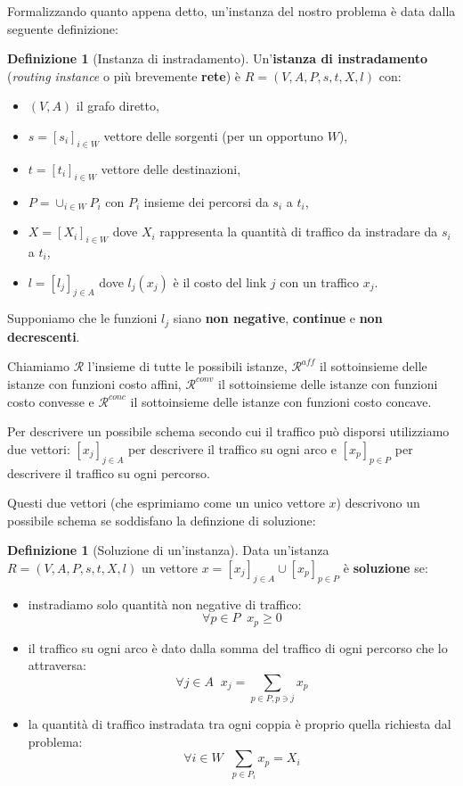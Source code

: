 \documentclass[a4paper]{article}
\newcounter{counter1}
\theoremstyle{plain}
\theoremstyle{definition}
\newtheorem{mydef}[counter1]{Definizione}
\theoremstyle{remark}
\newcommand{\bra}[1]{\left[#1\right]}
\begin{document}
Formalizzando quanto appena detto, un'instanza del nostro problema è
data dalla seguente definizione:

\begin{mydef}[Instanza di instradamento]
  Un'\textbf{istanza di instradamento} (\textit{routing instance} o
  più brevemente \textbf{rete}) è $R=(V,A,P,s,t,X,l)$ con:
  \begin{itemize}
  \item $(V,A)$ il grafo diretto,
  \item $s = \bra{s_i}_{i\in W}$ vettore delle sorgenti (per un opportuno $W$),
  \item $t = \bra{t_i}_{i\in W}$ vettore delle destinazioni,
  \item $P = \cup _{i\in W} P_i$ con $P_i$ insieme dei
    percorsi da $s_i$ a $t_i$,
  \item $X = \bra{X_i}_{i\in W}$ dove $X_i$ rappresenta la quantità di
    traffico da instradare da $s_i$ a $t_i$,
  \item $l = \bra{l_j}_{j\in A}$ dove $l_j(x_j)$ è il costo del link
    $j$ con un traffico $x_j$.
  \end{itemize}
  Supponiamo che le funzioni $l_j$ siano \textbf{non negative},
  \textbf{continue} e \textbf{non decrescenti}.
\end{mydef}

Chiamiamo $\mathcal{R}$ l'insieme di tutte le possibili istanze,
$\mathcal{R}^{aff}$ il sottoinsieme delle istanze con funzioni costo
affini, $\mathcal{R}^{conv}$ il sottoinsieme delle istanze con funzioni costo
convesse e $\mathcal{R}^{conc}$ il sottoinsieme delle istanze con
funzioni costo concave.

Per descrivere un possibile schema secondo cui il traffico può
disporsi utilizziamo due vettori: $\bra{x_j}_{j\in A}$ per descrivere
il traffico su ogni arco e $\bra{x_p}_{p\in P}$ per descrivere il
traffico su ogni percorso.

Questi due vettori (che esprimiamo come un unico vettore $x$)
descrivono un possibile schema se soddisfano la definzione di soluzione:

\begin{mydef}[Soluzione di un'instanza]
  Data un'istanza $R=(V,A,P,s,t,X,l)$ un vettore
  $x = \bra{x_j}_{j\in A} \cup \bra{x_p}_{p\in P}$ è \textbf{soluzione} se:
  \begin{itemize}
  \item instradiamo solo quantità non negative di traffico: \[ \forall p\in P\;\; x_p \ge 0\]
  \item il traffico su ogni arco è dato dalla somma del traffico di
    ogni percorso che lo attraversa: \[ \forall j\in A\;\; x_j = \sum_{p\in P,p\ni j} x_p\]
  \item la quantità di traffico instradata tra ogni coppia è proprio
    quella richiesta dal problema: \[\forall i\in W\;\; \sum_{p\in P_i} x_p = X_i\]
  \end{itemize}
\end{mydef}
\end{document}
